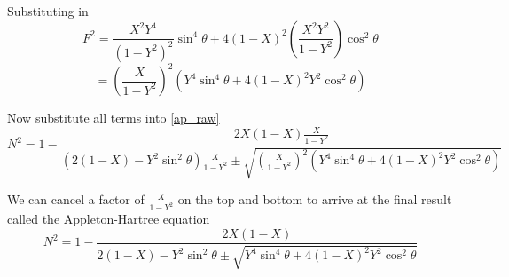 Substituting in
\begin{equation*}
	F^2 = \frac{X^2 Y^4}{\left( 1 - Y^2 \right)^2} \sin^4 \theta + 4 \left( 1 - X \right)^2 \left( \frac{X^2 Y^2}{1 - Y^2} \right) \cos^2 \theta
\end{equation*}
\begin{equation}
	= \left( \frac{X}{1 - Y^2} \right)^2 \left( Y^4 \sin^4 \theta + 4 \left( 1 - X \right)^2 Y^2 \cos^2 \theta \right)
\end{equation}

Now substitute all terms into \eqref{ap_raw}
\begin{equation}
	N^2 = 1 - \frac{2X \left( 1 - X \right) \frac{X}{1 - Y^2} }{\left( 2 \left(1 - X\right) - Y^2 \sin^2 \theta \right) \frac{X}{1 - Y^2} \pm \sqrt{ \left( \frac{X}{1 - Y^2} \right)^2 \left( Y^4 \sin^4 \theta + 4 \left( 1 - X \right)^2 Y^2 \cos^2 \theta \right) }}
\end{equation}

We can cancel a factor of $\frac{X}{1 - Y^2}$ on the top and bottom to arrive at the final result called the Appleton-Hartree equation
\begin{equation}\label{appleton_hartree}
	N^2 = 1 - \frac{2X \left(1 - X\right)}{2 \left(1 - X\right) - Y^2 \sin^2 \theta \pm \sqrt{Y^4 \sin^4 \theta + 4 \left(1 - X \right)^2 Y^2 \cos^2 \theta}}
\end{equation}

